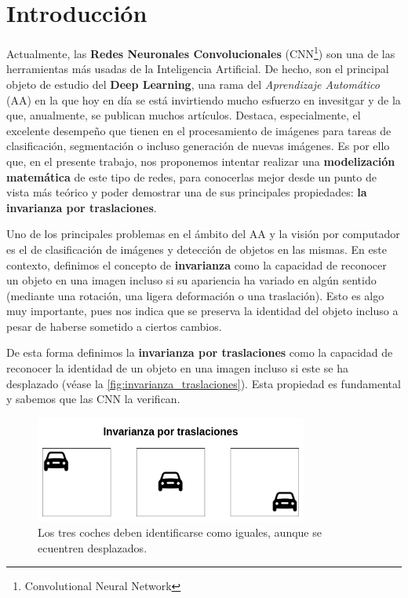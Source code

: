 

\chapter{Introducción}

\noindent Actualmente, las \textbf{Redes Neuronales Convolucionales} (CNN\footnote{Convolutional Neural Network}) son una de las herramientas más usadas de la Inteligencia Artificial. De hecho, son el principal objeto de estudio del \textbf{Deep Learning}, una rama del \textit{Aprendizaje Automático} (AA) en la que hoy en día se está invirtiendo mucho esfuerzo en invesitgar y de la que, anualmente, se publican muchos artículos. Destaca, especialmente, el excelente desempeño que tienen en el procesamiento de imágenes para tareas de clasificación, segmentación o incluso generación de nuevas imágenes. Es por ello que, en el presente trabajo, nos proponemos intentar realizar una \textbf{modelización matemática} de este tipo de redes, para conocerlas mejor desde un punto de vista más teórico y poder demostrar una de sus principales propiedades: \textbf{la invarianza por traslaciones}.

\medskip

\noindent Uno de los principales problemas en el ámbito del AA y la visión por computador es el de clasificación de imágenes y detección de objetos en las mismas. En este contexto, definimos el concepto de \textbf{invarianza} como la capacidad de reconocer un objeto en una imagen incluso si su apariencia ha variado en algún sentido (mediante una rotación, una  ligera deformación o una traslación). Esto es algo muy importante, pues nos indica que se preserva la identidad del objeto incluso a pesar de haberse sometido a ciertos cambios.

\medskip

\noindent De esta forma definimos la \textbf{invarianza por traslaciones} como la capacidad de reconocer la identidad de un objeto en una imagen incluso si este se ha desplazado (véase la \autoref{fig:invarianza_traslaciones}). Esta propiedad es fundamental y sabemos que las CNN la verifican.

\begin{figure} [!h]
    \centering
    \includegraphics[width=0.8\textwidth]{img/translation_invariance.png}
    \caption{Los tres coches deben identificarse como iguales, aunque se ecuentren desplazados.}
    \label{fig:invarianza_traslaciones}
\end{figure}

